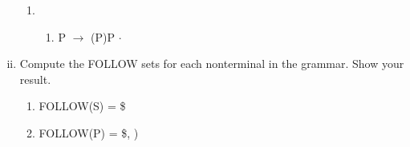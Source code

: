 \documentclass{article}
\begin{document}
\begin{enumerate}[i.]
\begin{enumerate}[(1)]
			\item \begin{enumerate}[]
				\item P $\to$ (P)P $\cdot$
			\end{enumerate}
		\end{enumerate}

	\item Compute the FOLLOW sets for each nonterminal in the grammar. Show
		your result.

		\begin{enumerate}[(1)]
			\item FOLLOW(S) = \$
			\item FOLLOW(P) = \$, )
		\end{enumerate}
\end{enumerate}
\end{document}
